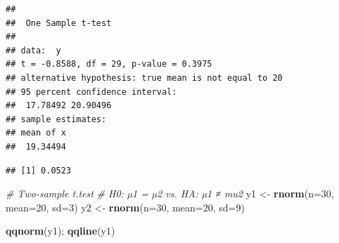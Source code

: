 \documentclass[
]{article}
\newenvironment{Shaded}{\begin{snugshade}}{\end{snugshade}}
\newcommand{\AttributeTok}[1]{\textcolor[rgb]{0.13,0.29,0.53}{#1}}
\newcommand{\CommentTok}[1]{\textcolor[rgb]{0.56,0.35,0.01}{\textit{#1}}}
\newcommand{\ControlFlowTok}[1]{\textcolor[rgb]{0.13,0.29,0.53}{\textbf{#1}}}
\newcommand{\DecValTok}[1]{\textcolor[rgb]{0.00,0.00,0.81}{#1}}
\newcommand{\FloatTok}[1]{\textcolor[rgb]{0.00,0.00,0.81}{#1}}
\newcommand{\FunctionTok}[1]{\textcolor[rgb]{0.13,0.29,0.53}{\textbf{#1}}}
\newcommand{\NormalTok}[1]{#1}
\newcommand{\OtherTok}[1]{\textcolor[rgb]{0.56,0.35,0.01}{#1}}
\newcommand{\SpecialCharTok}[1]{\textcolor[rgb]{0.81,0.36,0.00}{\textbf{#1}}}
\newcommand{\StringTok}[1]{\textcolor[rgb]{0.31,0.60,0.02}{#1}}
\begin{document}
\begin{verbatim}
## 
##  One Sample t-test
## 
## data:  y
## t = -0.8588, df = 29, p-value = 0.3975
## alternative hypothesis: true mean is not equal to 20
## 95 percent confidence interval:
##  17.78492 20.90496
## sample estimates:
## mean of x 
##  19.34494
\end{verbatim}

\begin{Shaded}
\end{Shaded}

\begin{verbatim}
## [1] 0.0523
\end{verbatim}

\begin{Shaded}
\begin{Highlighting}[]
\CommentTok{\# Two{-}sample t.test}
\CommentTok{\# H0: µ1 = µ2 vs. HA: µ1 ≠ mu2}
\NormalTok{y1 }\OtherTok{\textless{}{-}} \FunctionTok{rnorm}\NormalTok{(}\AttributeTok{n=}\DecValTok{30}\NormalTok{, }\AttributeTok{mean=}\DecValTok{20}\NormalTok{, }\AttributeTok{sd=}\DecValTok{3}\NormalTok{)}
\NormalTok{y2 }\OtherTok{\textless{}{-}} \FunctionTok{rnorm}\NormalTok{(}\AttributeTok{n=}\DecValTok{30}\NormalTok{, }\AttributeTok{mean=}\DecValTok{20}\NormalTok{, }\AttributeTok{sd=}\DecValTok{9}\NormalTok{)}

\FunctionTok{qqnorm}\NormalTok{(y1); }\FunctionTok{qqline}\NormalTok{(y1)}
\end{Highlighting}
\end{Shaded}
\end{document}
